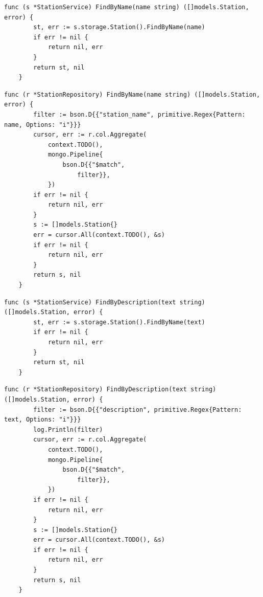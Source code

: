 \begin{lstlisting}[label=list:service_read_station_FindByName,caption=Serwis wyszukiwania stacji ładowniczych według nazwy,basicstyle=\tiny\ttfamily]
    func (s *StationService) FindByName(name string) ([]models.Station, error) {
        st, err := s.storage.Station().FindByName(name)
        if err != nil {
            return nil, err
        }
        return st, nil
    }
\end{lstlisting}
\begin{lstlisting}[label=list:repo_read_station_FindByName,caption=Wyszukiwanie stacji ładowniczych w bazie danych według nazwy,basicstyle=\tiny\ttfamily]
    func (r *StationRepository) FindByName(name string) ([]models.Station, error) {
        filter := bson.D{{"station_name", primitive.Regex{Pattern: name, Options: "i"}}}
        cursor, err := r.col.Aggregate(
            context.TODO(),
            mongo.Pipeline{
                bson.D{{"$match",
                    filter}},
            })
        if err != nil {
            return nil, err
        }
        s := []models.Station{}
        err = cursor.All(context.TODO(), &s)
        if err != nil {
            return nil, err
        }
        return s, nil
    }
\end{lstlisting}
\begin{lstlisting}[label=list:service_read_station_FindByDescription,caption=Serwis wyszukiwania stacji ładowniczych według opisu,basicstyle=\tiny\ttfamily]
    func (s *StationService) FindByDescription(text string) ([]models.Station, error) {
        st, err := s.storage.Station().FindByName(text)
        if err != nil {
            return nil, err
        }
        return st, nil
    }
\end{lstlisting}
\begin{lstlisting}[label=list:repo_read_station_FindByDescription,caption=Wyszukiwanie stacji ładowniczych w bazie danych według opisu,basicstyle=\tiny\ttfamily]
    func (r *StationRepository) FindByDescription(text string) ([]models.Station, error) {
        filter := bson.D{{"description", primitive.Regex{Pattern: text, Options: "i"}}}
        log.Println(filter)
        cursor, err := r.col.Aggregate(
            context.TODO(),
            mongo.Pipeline{
                bson.D{{"$match",
                    filter}},
            })
        if err != nil {
            return nil, err
        }
        s := []models.Station{}
        err = cursor.All(context.TODO(), &s)
        if err != nil {
            return nil, err
        }
        return s, nil
    }
\end{lstlisting}
